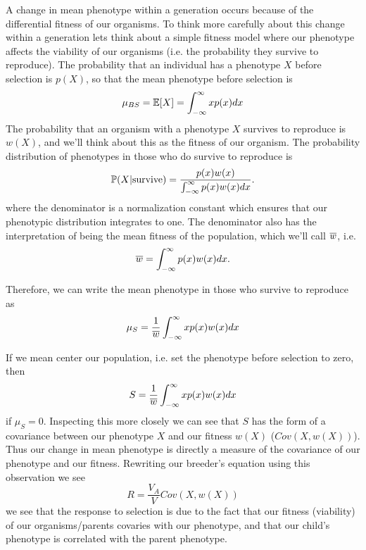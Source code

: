 A change in mean phenotype within a generation occurs because of the
differential fitness of our organisms. To think more carefully about this change within a
generation lets think about a simple fitness model where our phenotype affects the
viability of our organisms (i.e. the probability they survive to
reproduce). The probability that an individual has a phenotype $X$
before selection is $p(X)$, so that the mean phenotype before
selection is
\begin{equation}
\mu_{BS} = \E[X] =  \int_{-\infty}^{\infty} x p(x) dx
\end{equation}
The probability that an organism with a phenotype $X$ survives to
reproduce is $w(X)$, and we'll think about this as the fitness of
our organism. The probability distribution of phenotypes in those who
do survive to reproduce is
\begin{equation}
\P(X | \textrm{survive}) =  \frac{p(x) w(x)}{
\int_{-\infty}^{\infty} p(x) w(x) dx}.
\end{equation}
where the denominator is a normalization constant which ensures that
our phenotypic distribution integrates to one. The denominator also
has the interpretation of being the mean fitness of the population,
which we'll call $\wbar$, i.e.  
\begin{equation}
\wbar =  
\int_{-\infty}^{\infty} p(x) w(x) dx.
\end{equation}

Therefore, we can write the mean phenotype in those who survive to
reproduce as
\begin{equation}
\mu_S = \frac{1}{\wbar}\int_{-\infty}^{\infty} x p(x) w(x) dx
\end{equation}

If we mean center our population, i.e. set the phenotype before
selection to zero, then
\begin{equation}
S= \frac{1}{\wbar}\int_{-\infty}^{\infty} x p(x) w(x) dx
\end{equation}
if $\mu_S=0$.  Inspecting this more closely we can see that $S$ has
the form of a covariance between our phenotype $X$ and our fitness
$w(X)$ ($Cov(X,w(X))$). Thus our change in mean phenotype is directly a measure of the
covariance of our phenotype and our fitness. Rewriting our breeder's
equation using this observation we see
\begin{equation}
R = \frac{V_A}{V}  Cov(X,w(X))
\end{equation}
we see that the response to selection is due to the fact that our
fitness (viability) of our organisms/parents covaries with our phenotype, and
that our child's phenotype is correlated with the parent phenotype.

